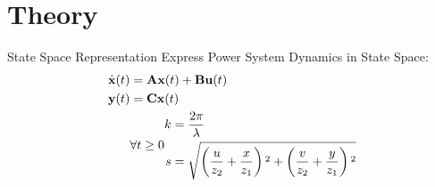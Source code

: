 \section[Theory]{Theory}
\label{sec:lasso_theory}

\begin{frame}[fragile]{State Space Representation}
	Express Power System Dynamics in State Space:
	\begin{equation}
		\label{eq:ssr}
		\begin{align}
			\dot{\textbf{x}}(t) &= 
			 \textbf{A}\textbf{x}(t)
			+ \textbf{B}\textbf{u}(t)\\
			\textbf{y}(t) &= 
			 \textbf{C}\textbf{x}(t)\\  
			& \forall t\geq0
			\begin{aligned}
				k &=\frac{2 \pi }{\lambda }\\
				s &=\sqrt{\left(\frac{u}{z_2}+\frac{x}{z_1}\right){}^2+\left(\frac{v}{z_2}+\frac{y}{z_1}\right){}^2}
			\end{aligned}\notag
		\end{align}
	\end{equation}
\end{frame}